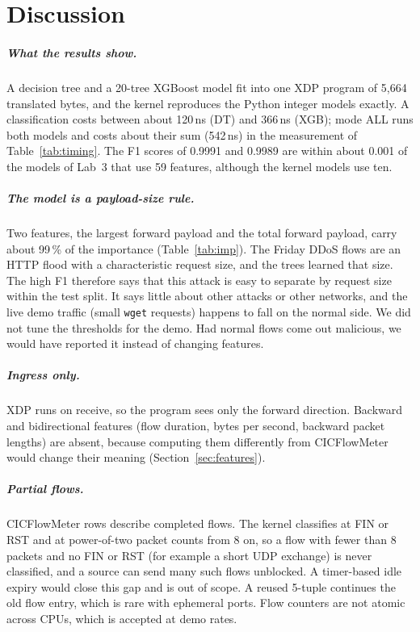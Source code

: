 \chapter{Discussion}\label{chap:discussion}

\paragraph{What the results show.} A decision tree and a 20-tree XGBoost model fit into one XDP program of 5,664 translated bytes, and the kernel reproduces the Python integer models exactly. A classification costs between about 120\,ns (DT) and 366\,ns (XGB); mode ALL runs both models and costs about their sum (542\,ns) in the measurement of Table~\ref{tab:timing}. The F1 scores of 0.9991 and 0.9989 are within about 0.001 of the models of Lab~3 that use 59 features, although the kernel models use ten.

\paragraph{The model is a payload-size rule.} Two features, the largest forward payload and the total forward payload, carry about 99\,\% of the importance (Table~\ref{tab:imp}). The Friday DDoS flows are an HTTP flood with a characteristic request size, and the trees learned that size. The high F1 therefore says that this attack is easy to separate by request size within the test split. It says little about other attacks or other networks, and the live demo traffic (small \texttt{wget} requests) happens to fall on the normal side. We did not tune the thresholds for the demo. Had normal flows come out malicious, we would have reported it instead of changing features.

\paragraph{Ingress only.} XDP runs on receive, so the program sees only the forward direction. Backward and bidirectional features (flow duration, bytes per second, backward packet lengths) are absent, because computing them differently from CICFlowMeter would change their meaning (Section~\ref{sec:features}).

\paragraph{Partial flows.} CICFlowMeter rows describe completed flows. The kernel classifies at FIN or RST and at power-of-two packet counts from 8 on, so a flow with fewer than 8 packets and no FIN or RST (for example a short UDP exchange) is never classified, and a source can send many such flows unblocked. A timer-based idle expiry would close this gap and is out of scope. A reused 5-tuple continues the old flow entry, which is rare with ephemeral ports. Flow counters are not atomic across CPUs, which is accepted at demo rates.

